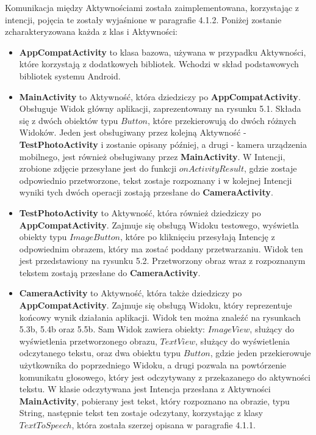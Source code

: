\documentclass[eng,oneside]{mgr}
\begin{document}
\par Komunikacja między Aktywnościami została zaimplementowana, korzystając z intencji, pojęcia te zostały wyjaśnione w paragrafie 4.1.2. Poniżej zostanie zcharakteryzowana każda z klas i Aktywności:
\begin{itemize}
\item \textbf{AppCompatActivity} to klasa bazowa, używana w przypadku Aktywności, które korzystają z dodatkowych bibliotek. Wchodzi w skład podstawowych bibliotek systemu Android\cite{appcompat}. 
\item \textbf{MainActivity} to Aktywność, która dziedziczy po \textbf{AppCompatActivity}. Obsługuje Widok główny aplikacji, zaprezentowany na rysunku 5.1. Składa się z dwóch obiektów typu $Button$, które przekierowują do dwóch różnych Widoków. Jeden jest obsługiwany przez kolejną Aktywność - \textbf{TestPhotoActivity} i zostanie opisany później, a drugi - kamera urządzenia mobilnego, jest również obsługiwany przez \textbf{MainActivity}. W Intencji, zrobione zdjęcie przesyłane jest do funkcji $onActivityResult$, gdzie zostaje odpowiednio przetworzone, tekst zostaje rozpoznany i w kolejnej Intencji wyniki tych dwóch operacji zostają przesłane do \textbf{CameraActivity}.
\item \textbf{TestPhotoActivity} to Aktywność, która również dziedziczy po \textbf{AppCompatActivity}. Zajmuje się obsługą Widoku testowego, wyświetla obiekty typu $ImageButton$, które po kliknięciu przesyłają Intencję z odpowiednim obrazem, który ma zostać poddany przetwarzaniu. Widok ten jest przedstawiony na rysunku 5.2. Przetworzony obraz wraz z rozpoznanym tekstem zostają przesłane do \textbf{CameraActivity}.
\item \textbf{CameraActivity} to Aktywność, która także dziedziczy po \textbf{AppCompatActivity}. Zajmuje się obsługą Widoku, który reprezentuje końcowy wynik działania aplikacji. Widok ten można znaleźć na rysunkach 5.3b, 5.4b oraz 5.5b. Sam Widok zawiera obiekty: $ImageView$, służący do wyświetlenia przetworzonego obrazu, $TextView$, służący do wyświetlenia odczytanego tekstu, oraz dwa obiektu typu $Button$, gdzie jeden przekierowuje użytkownika do poprzedniego Widoku, a drugi pozwala na powtórzenie komunikatu głosowego, który jest odczytywany z przekazanego do aktywności tekstu. W klasie odczytywana jest Intencja przesłana z Aktywności \textbf{MainActivity}, pobierany jest tekst, który rozpoznano na obrazie, typu String, następnie tekst ten zostaje odczytany, korzystając z klasy $TextToSpeech$, która została szerzej opisana w paragrafie 4.1.1.

\end{itemize}
\end{document}

